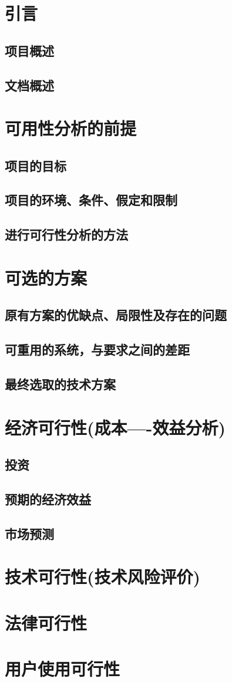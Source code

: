 \documentclass[12pt]{article}
\begin{document}
	\tableofcontents
	\section{引言}
	\subsection{项目概述}
	\subsection{文档概述}
	\section{可用性分析的前提}
	\subsection{项目的目标}
	\subsection{项目的环境、条件、假定和限制}
	\subsection{进行可行性分析的方法}
	\section{可选的方案}
	\subsection{原有方案的优缺点、局限性及存在的问题}
	\subsection{可重用的系统，与要求之间的差距}
	\subsection{最终选取的技术方案}
	\section{经济可行性(成本----效益分析)}
	\subsection{投资}
	\subsection{预期的经济效益}
	\subsection{市场预测}
	\section{技术可行性(技术风险评价)}
	\section{法律可行性}
	\section{用户使用可行性}
	
\end{document}
